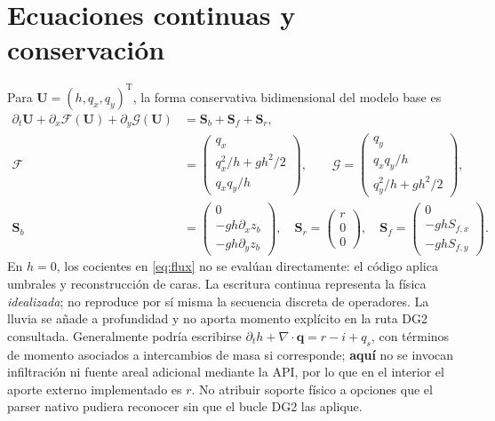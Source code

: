 \documentclass[11pt,a4paper]{article}
\begin{document}
\section{Ecuaciones continuas y conservación}
\label{sec:ecuaciones}
Para $\boldsymbol U=(h,q_x,q_y)^{\mathrm T}$, la forma conservativa bidimensional del modelo base es
\begin{align}
\partial_t\boldsymbol U+\partial_x\mathcal F(\boldsymbol U)+\partial_y\mathcal G(\boldsymbol U)&=\boldsymbol S_b+\boldsymbol S_f+\boldsymbol S_r,\label{eq:conserv}\\
\mathcal F&=\begin{pmatrix}q_x\\ q_x^2/h+gh^2/2\\q_xq_y/h\end{pmatrix},\qquad
\mathcal G=\begin{pmatrix}q_y\\q_xq_y/h\\q_y^2/h+gh^2/2\end{pmatrix},\label{eq:flux}\\
\boldsymbol S_b&=\begin{pmatrix}0\\-gh\partial_xz_b\\-gh\partial_yz_b\end{pmatrix},\quad
\boldsymbol S_r=\begin{pmatrix}r\\0\\0\end{pmatrix},\quad
\boldsymbol S_f=\begin{pmatrix}0\\-ghS_{f,x}\\-ghS_{f,y}\end{pmatrix}.\label{eq:sources}
\end{align}
En $h=0$, los cocientes en \eqref{eq:flux} no se evalúan directamente: el código aplica umbrales y reconstrucción de caras. La escritura continua representa la física \emph{idealizada}; no reproduce por sí misma la secuencia discreta de operadores. La lluvia se añade a profundidad y no aporta momento explícito en la ruta DG2 consultada. Generalmente podría escribirse $\partial_t h+\nabla\cdot\boldsymbol q=r-i+q_s$, con términos de momento asociados a intercambios de masa si corresponde; \textbf{aquí} no se invocan infiltración ni fuente areal adicional mediante la API, por lo que en el interior el aporte externo implementado es $r$. No atribuir soporte físico a opciones que el parser nativo pudiera reconocer sin que el bucle DG2 las aplique.
\end{document}
